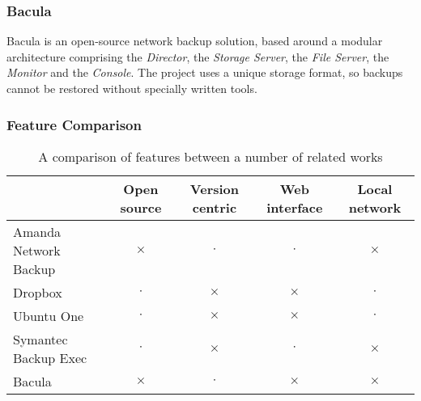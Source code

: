 \subsubsection{Bacula}

Bacula is an open-source network backup solution, based around a modular
architecture comprising the \emph{Director}, the \emph{Storage Server}, the
\emph{File Server}, the \emph{Monitor} and the \emph{Console}. The project uses
a unique storage format, so backups cannot be restored without specially
written tools.

\subsubsection{Feature Comparison}

\begin{table}[H]
    \centering
    \begin{tabular}{ | l | c | c | c | c | }
        \hline
        & Open source   & Version centric   & Web interface & Local network
            \\ \hline

        Amanda Network Backup   & $\times$  & $\cdot$   & $\cdot$   & $\times$
            \\ \hline

        Dropbox                 & $\cdot$   & $\times$  & $\times$  & $\cdot$
            \\ \hline

        Ubuntu One              & $\cdot$   & $\times$  & $\times$  & $\cdot$
            \\ \hline

        Symantec Backup Exec    & $\cdot$   & $\times$  & $\cdot$   & $\times$
            \\ \hline

        Bacula                  & $\times$  & $\cdot$   & $\times$  & $\times$
            \\ \hline
    \end{tabular}
    \caption{A comparison of features between a number of related works}
    \label{tab:feature-comparison}
\end{table}
